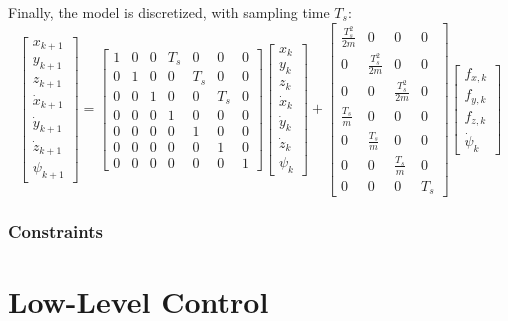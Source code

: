\documentclass[a4paper, 12pt]{report}
\begin{document}
Finally, the model is discretized, with sampling time $T_s$:
\[\begin{bmatrix} x_{k+1} \\ y_{k+1} \\ z_{k+1} \\ \dot x_{k+1} \\ \dot y_{k+1} \\ \dot z_{k+1} \\ \psi_{k+1} \end{bmatrix}  = 
\begin{bmatrix}  1 & 0 & 0 & T_s & 0 & 0 & 0 \\ 0 & 1 & 0 & 0 & T_s & 0 & 0 \\ 0 & 0 & 1 & 0 & 0 & T_s & 0 \\ 0 & 0 & 0 & 1 & 0 & 0 & 0 \\ 0 & 0 & 0 & 0 & 1 & 0 & 0 \\ 0 & 0 & 0 & 0 & 0 & 1 & 0 \\ 0 & 0 & 0 & 0 & 0 & 0 & 1 \end{bmatrix} 
\begin{bmatrix} x_k \\ y_k \\ z_k \\ \dot x_k \\ \dot y_k \\ \dot z_k \\ \psi_k \end{bmatrix}  + \begin{bmatrix}  \frac{T^2_s}{2m} & 0 & 0 & 0 \\ 0 & \frac{T^2_s}{2m} & 0 & 0 \\ 0 & 0 & \frac{T^2_s}{2m} & 0 \\ \frac{T_s}{m} & 0 & 0 & 0 \\ 0 & \frac{T_s}{m} & 0 & 0 \\ 0 & 0 & \frac{T_s}{m} & 0 \\ 0 & 0 & 0 & T_s \end{bmatrix} \begin{bmatrix} f_{x,k} \\ f_{y,k} \\ f_{z,k} \\ \dot \psi_k \end{bmatrix} \]
\subsubsection{Constraints}

\newpage
\section{Low-Level Control}
\end{document}
